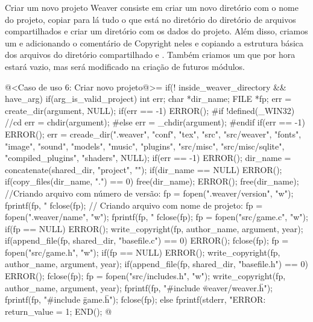{

Criar um novo projeto Weaver consiste em criar um novo diretório com o
nome do projeto, copiar para lá tudo o que está no diretório
 do diretório de arquivos compartilhados e criar um
diretório  com os dados do projeto. Além disso,
criamos um  e  adicionando o
comentário de Copyright neles e copiando a estrutura básica dos
arquivos do diretório compartilhado  e
. Também criamos um
 que por hora estará vazio, mas será modificado
na criação de futuros módulos.

\iniciocodigo
@<Caso de uso 6: Criar novo projeto@>=
if(! inside_weaver_directory && have_arg){
  if(arg_is_valid_project){
    int err;
    char *dir_name;
    FILE *fp;
    err = create_dir(argument, NULL);
    if(err == -1) ERROR();
#if !defined(_WIN32) //cd
    err = chdir(argument);
#else
    err = _chdir(argument);
#endif
    if(err == -1) ERROR();
    err = creade_dir(".weaver", "conf", "tex", "src", "src/weaver",
                     "fonts", "image", "sound", "models", "music",
                     "plugins", "src/misc", "src/misc/sqlite",
                     "compiled_plugins", "shaders", NULL);
    if(err == -1) ERROR();
    dir_name = concatenate(shared_dir, "project", "");
    if(dir_name == NULL) ERROR();
    if(copy_files(dir_name, ".") == 0){
      free(dir_name);
      ERROR();
    }
    free(dir_name); //Criando arquivo com número de versão:
    fp = fopen(".weaver/version", "w");
    fprintf(fp, "%
    fclose(fp); // Criando arquivo com nome de projeto:
    fp = fopen(".weaver/name", "w");
    fprintf(fp, "%
    fclose(fp);
    fp = fopen("src/game.c", "w");
    if(fp == NULL) ERROR();
    write_copyright(fp, author_name, argument, year);
    if(append_file(fp, shared_dir, "basefile.c") == 0) ERROR();
    fclose(fp);
    fp = fopen("src/game.h", "w");
    if(fp == NULL) ERROR();
    write_copyright(fp, author_name, argument, year);
    if(append_file(fp, shared_dir, "basefile.h") == 0) ERROR();
    fclose(fp);
    fp = fopen("src/includes.h", "w");
    write_copyright(fp, author_name, argument, year);
    fprintf(fp, "\n#include \"weaver/weaver.h\"\n");
    fprintf(fp, "\n#include \"game.h\"\n");
    fclose(fp);
  }
  else{
    fprintf(stderr, "ERROR: %
    return_value = 1;
  }
  END();
}
@
\fimcodigo

}
